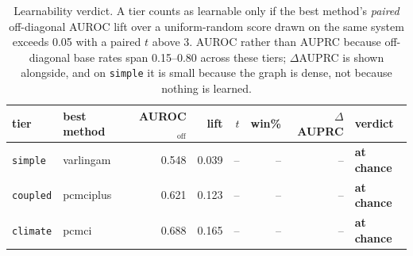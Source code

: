 \begin{table}[t]\centering\small
\caption{Learnability verdict. A tier counts as learnable only if the best method's \emph{paired} off-diagonal AUROC lift over a uniform-random score drawn on the same system exceeds 0.05 with a paired $t$ above 3. AUROC rather than AUPRC because off-diagonal base rates span 0.15--0.80 across these tiers; $\Delta$AUPRC is shown alongside, and on \texttt{simple} it is small because the graph is dense, not because nothing is learned.}
\label{tab:bench-dynamics-learnable}
\begin{tabular}{llrrrrrl}\toprule
tier & best method & AUROC$_\text{off}$ & lift & $t$ & win\% & $\Delta$AUPRC & verdict\\\midrule
\texttt{simple} & varlingam & 0.548 & 0.039 & -- & -- & -- & \textbf{at chance}\\
\texttt{coupled} & pcmciplus & 0.621 & 0.123 & -- & -- & -- & \textbf{at chance}\\
\texttt{climate} & pcmci & 0.688 & 0.165 & -- & -- & -- & \textbf{at chance}\\
\bottomrule\end{tabular}\end{table}

